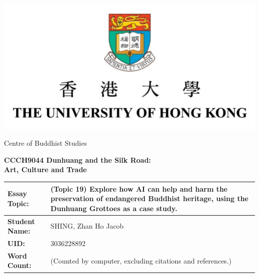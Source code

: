 \begin{center}
    \vspace*{1.5cm}

    \includegraphics{figs/misc/essay-cover-hku-logo.png}

    {\large Centre of Buddhist Studies}

    \vspace*{3cm}

    {\Large \textbf{CCCH9044 Dunhuang and the Silk Road: \\
    Art, Culture and Trade}}

    \vspace*{3cm}

    {
    \begin{tabularx}{\textwidth}{|l|X|}
        \hline
        \textbf{Essay Topic:} & (Topic 19) Explore how AI can help and harm the preservation of
        endangered Buddhist heritage,
        using the Dunhuang Grottoes as a case study. \\
        \hline
        \textbf{Student Name:} & SHING, Zhan Ho Jacob \\
        \hline
        \textbf{UID:} & 3036228892 \\
        \hline
        \textbf{Word Count:} &  (Counted by computer, excluding citations and references.)\\
        \hline
    \end{tabularx}}
\end{center}
